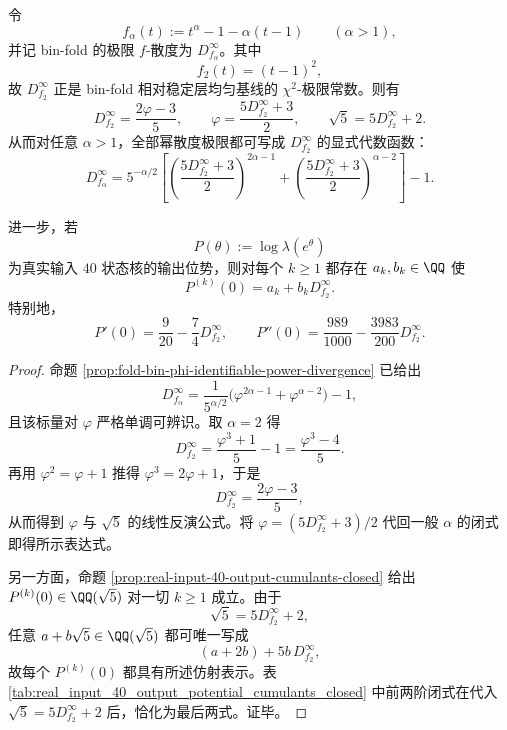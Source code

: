 \begin{conclusion}\label{con:xi-time-part9l-chi2-generates-power-divergence-and-cumulants}
令
\[
f_\alpha(t):=t^\alpha-1-\alpha(t-1)\qquad(\alpha>1),
\]
并记 bin-fold 的极限 \(f\)-散度为 \(D_{f_\alpha}^\infty\)。其中
\[
f_2(t)=(t-1)^2,
\]
故 \(D_{f_2}^\infty\) 正是 bin-fold 相对稳定层均匀基线的 \(\chi^2\)-极限常数。则有
\[
D_{f_2}^\infty=\frac{2\varphi-3}{5},
\qquad
\varphi=\frac{5D_{f_2}^\infty+3}{2},
\qquad
\sqrt5=5D_{f_2}^\infty+2.
\]
从而对任意 \(\alpha>1\)，全部幂散度极限都可写成 \(D_{f_2}^\infty\) 的显式代数函数：
\[
D_{f_\alpha}^\infty
=
5^{-\alpha/2}
\left[
\left(\frac{5D_{f_2}^\infty+3}{2}\right)^{2\alpha-1}
+
\left(\frac{5D_{f_2}^\infty+3}{2}\right)^{\alpha-2}
\right]-1.
\]

进一步，若
\[
P(\theta):=\log\lambda(e^\theta)
\]
为真实输入 \(40\) 状态核的输出位势，则对每个 \(k\ge 1\) 都存在 \(a_k,b_k\in\QQ\) 使
\[
P^{(k)}(0)=a_k+b_k D_{f_2}^\infty.
\]
特别地，
\[
P'(0)=\frac{9}{20}-\frac{7}{4}D_{f_2}^\infty,
\qquad
P''(0)=\frac{989}{1000}-\frac{3983}{200}D_{f_2}^\infty.
\]
\end{conclusion}
\begin{proof}
命题 \ref{prop:fold-bin-phi-identifiable-power-divergence} 已给出
\[
D_{f_\alpha}^\infty
=
\frac{1}{5^{\alpha/2}}\bigl(\varphi^{2\alpha-1}+\varphi^{\alpha-2}\bigr)-1,
\]
且该标量对 \(\varphi\) 严格单调可辨识。取 \(\alpha=2\) 得
\[
D_{f_2}^\infty
=
\frac{\varphi^3+1}{5}-1
=
\frac{\varphi^3-4}{5}.
\]
再用 \(\varphi^2=\varphi+1\) 推得 \(\varphi^3=2\varphi+1\)，于是
\[
D_{f_2}^\infty=\frac{2\varphi-3}{5},
\]
从而得到 \(\varphi\) 与 \(\sqrt5\) 的线性反演公式。将 \(\varphi=(5D_{f_2}^\infty+3)/2\) 代回一般 \(\alpha\) 的闭式即得所示表达式。

另一方面，命题 \ref{prop:real-input-40-output-cumulants-closed} 给出 \(P^{(k)}(0)\in\QQ(\sqrt5)\) 对一切 \(k\ge 1\) 成立。由于
\[
\sqrt5=5D_{f_2}^\infty+2,
\]
任意 \(a+b\sqrt5\in\QQ(\sqrt5)\) 都可唯一写成
\[
(a+2b)+5b\,D_{f_2}^\infty,
\]
故每个 \(P^{(k)}(0)\) 都具有所述仿射表示。表 \ref{tab:real_input_40_output_potential_cumulants_closed} 中前两阶闭式在代入 \(\sqrt5=5D_{f_2}^\infty+2\) 后，恰化为最后两式。证毕。
\end{proof}


